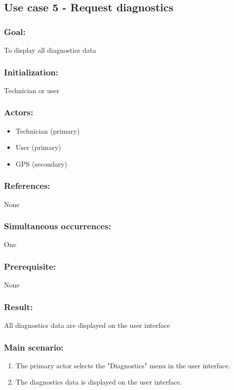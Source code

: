 \begin{framed}
	\subsection{Use case 5 - Request diagnostics}
	\subsubsection*{Goal:}
	To display all diagnostics data
	
	\subsubsection*{Initialization:}
	Technician or user
	
	\subsubsection*{Actors:}
	\begin{itemize}
		\item Technician (primary)
		\item User (primary)
		\item GPS (secondary)
	\end{itemize}
	
	\subsubsection*{References:}
	None
	
	\subsubsection*{Simultaneous occurrences:}
	One
	
	\subsubsection*{Prerequisite:}
	None
	
	\subsubsection*{Result:}
	All diagnostics data are displayed on the user interface
	
	\subsubsection*{Main scenario:}
	\begin{enumerate}
		\item The primary actor selects the "Diagnostics" menu in the user interface.
		\item The diagnostics data is displayed on the user interface. 
	\end{enumerate}
\end{framed}




